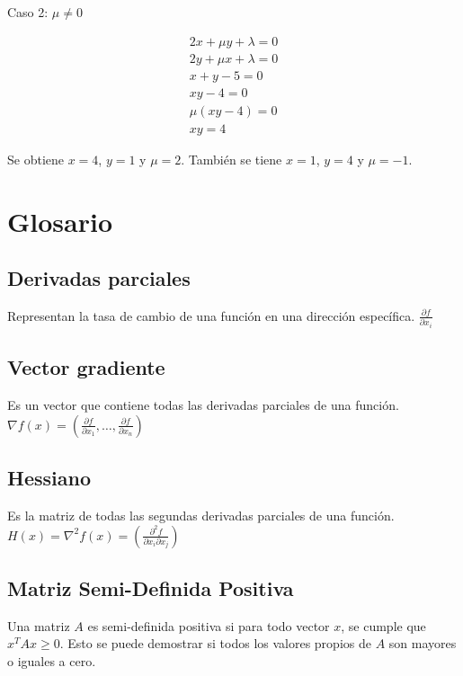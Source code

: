 \documentclass{article}
\newenvironment{solution}
{\begin{mdframed}[backgroundcolor=lightorange,hidealllines=true]}
{\end{mdframed}}
\begin{document}
\begin{solution}
    Caso 2: $\mu \neq 0$

    \begin{align*}
        2x + \mu y + \lambda = 0 \\
        2y + \mu x + \lambda = 0 \\
        x + y - 5 = 0            \\
        xy - 4 = 0               \\
        \mu(xy-4) = 0            \\
        xy = 4
    \end{align*}

    Se obtiene $x=4$, $y=1$ y $\mu = 2$. También se tiene $x=1$, $y=4$ y $\mu = -1$.

\end{solution}

\section{Glosario}

\subsection*{Derivadas parciales}

Representan la tasa de cambio de una función en una dirección específica. $\frac{\partial f}{\partial x_i}$

\subsection*{Vector gradiente}

Es un vector que contiene todas las derivadas parciales de una función. $\nabla f(x) = \left( \frac{\partial f}{\partial x_1}, \ldots, \frac{\partial f}{\partial x_n} \right)$

\subsection*{Hessiano}

Es la matriz de todas las segundas derivadas parciales de una función. $H(x)=\nabla^2f(x) = \left( \frac{\partial^2 f}{\partial x_i \partial x_j} \right)$

\subsection*{Matriz Semi-Definida Positiva}

Una matriz $A$ es semi-definida positiva si para todo vector $x$, se cumple que $x^T A x \geq 0$. Esto se puede demostrar si todos los valores propios de $A$ son mayores o iguales a cero.
\end{document}
